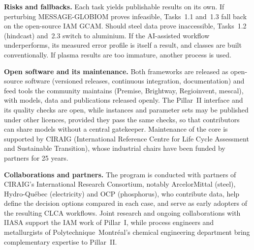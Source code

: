 \documentclass[compact]{nserc} %
\begin{document}
\noindent \textbf{Risks and fallbacks.} Each task yields publishable results on its own. If perturbing MESSAGE-GLOBIOM proves infeasible, Tasks~1.1 and~1.3 fall back on the open-source IAM GCAM. Should steel data prove inaccessible, Tasks~1.2 (hindcast) and~2.3 switch to aluminium. If the AI-assisted workflow underperforms, its measured error profile is itself a result, and classes are built conventionally. If plasma results are too immature, another process is used.

\noindent \textbf{Open software and its maintenance.} Both frameworks are released as open-source software (versioned releases, continuous integration, documentation) and feed tools the community maintains (Premise, Brightway, Regioinvent, mescal), with models, data and publications released openly. The Pillar~II interface and its quality checks are open, while instances and parameter sets may be published under other licences, provided they pass the same checks, so that contributors can share models without a central gatekeeper. Maintenance of the core is supported by CIRAIG (International Reference Centre for Life Cycle Assessment and Sustainable Transition), whose industrial chairs have been funded by partners for 25 years.

\noindent \textbf{Collaborations and partners.} The program is conducted with partners of CIRAIG's International Research Consortium, notably ArcelorMittal (steel), Hydro-Québec (electricity) and OCP (phosphorus), who contribute data, help define the decision options compared in each case, and serve as early adopters of the resulting CLCA workflows. Joint research and ongoing collaborations with IIASA support the IAM work of Pillar~I, while process engineers and metallurgists of Polytechnique~Montréal's chemical engineering department bring complementary expertise to Pillar~II.
\end{document}
